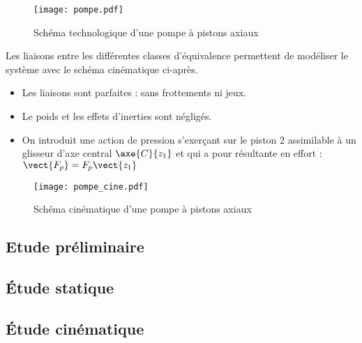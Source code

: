 \begin{figure}[H]
  \texttt{[image: pompe.pdf]}
  
  \caption{Schéma technologique d'une pompe à pistons axiaux \label{fig:techno_pompe}}
\end{figure}


Les liaisons entre les différentes classes d'équivalence permettent de modéliser le système avec le schéma cinématique ci-après.



\begin{itemize}
\item Les liaisons sont parfaites : sans frottements ni jeux.
\item Le poids et les effets d'inerties sont négligés.
\item On introduit une action de pression s'exerçant sur le piston 2 assimilable à un glisseur d'axe central $\axe{C}{{z_1}}$ et qui a pour résultante en effort : $\vect{F_p}=F_p\vect{z_1}$
\end{itemize}


\begin{figure}[H]
 \texttt{[image: pompe\_cine.pdf]}
 
 \caption{Schéma cinématique d'une pompe à pistons axiaux \label{fig:cine_pompe}}
\end{figure}

\subsection*{Etude préliminaire}



\subsection*{Étude statique}



\subsection*{Étude cinématique}


